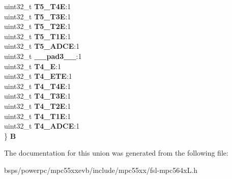 \begin{DoxyCompactItemize}
\begin{tabbing}
\>uint32\_t {\bfseries T5\_T4E}:1\\
\>uint32\_t {\bfseries T5\_T3E}:1\\
\>uint32\_t {\bfseries T5\_T2E}:1\\
\>uint32\_t {\bfseries T5\_T1E}:1\\
\>uint32\_t {\bfseries T5\_ADCE}:1\\
\>uint32\_t {\bfseries \_\_pad3\_\_}:1\\
\>uint32\_t {\bfseries T4\_E}:1\\
\>uint32\_t {\bfseries T4\_ETE}:1\\
\>uint32\_t {\bfseries T4\_T4E}:1\\
\>uint32\_t {\bfseries T4\_T3E}:1\\
\>uint32\_t {\bfseries T4\_T2E}:1\\
\>uint32\_t {\bfseries T4\_T1E}:1\\
\>uint32\_t {\bfseries T4\_ADCE}:1\\
\} {\bfseries B}\\

\end{tabbing}\end{DoxyCompactItemize}


The documentation for this union was generated from the following file\+:\begin{DoxyCompactItemize}
\item 
bsps/powerpc/mpc55xxevb/include/mpc55xx/fsl-\/mpc564x\+L.\+h\end{DoxyCompactItemize}
